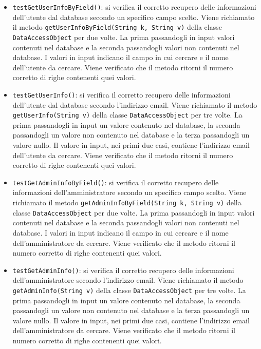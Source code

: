 {{\begin{itemize}
\begin{itemize}
\begin{itemize}
						\item \texttt{testGetUserInfoByField()}: si verifica il corretto recupero delle informazioni dell'utente dal database secondo un specifico campo scelto. Viene richiamato il metodo \texttt{getUserInfoByField(String k, String v)} della classe \texttt{DataAccessObject} per due volte. La prima passandogli in input valori contenuti nel database e la seconda passandogli valori non contenuti nel database. I valori in input indicano il campo in cui cercare e il nome dell'utente da cercare. Viene verificato che il metodo ritorni il numero corretto di righe contenenti quei valori.
						
						\item \texttt{testGetUserInfo()}: si verifica il corretto recupero delle informazioni dell'utente dal database secondo l'indirizzo email. Viene richiamato il metodo \texttt{getUserInfo(String v)} della classe \texttt{DataAccessObject} per tre volte. La prima passandogli in input un valore contenuto nel database, la seconda passandogli un valore non contenuto nel database e la terza passandogli un valore nullo. Il valore in input, nei primi due casi, contiene l'indirizzo email dell'utente da cercare. Viene verificato che il metodo ritorni il numero corretto di righe contenenti quei valori.
						
						\item \texttt{testGetAdminInfoByField()}: si verifica il corretto recupero delle informazioni dell'amministratore secondo un specifico campo scelto. \newline Viene richiamato il metodo \texttt{getAdminInfoByField(String k, String v)} della classe \texttt{DataAccessObject} per due volte. La prima passandogli in input valori contenuti nel database e la seconda passandogli valori non contenuti nel database. I valori in input indicano il campo in cui cercare e il nome dell'amministratore da cercare. Viene verificato che il metodo ritorni il numero corretto di righe contenenti quei valori.
						
						\item \texttt{testGetAdminInfo()}: si verifica il corretto recupero delle informazioni dell'amministratore secondo l'indirizzo email. Viene richiamato il metodo \texttt{getAdminInfo(String v)} della classe \texttt{DataAccessObject} per tre volte. La prima passandogli in input un valore contenuto nel database, la seconda passandogli un valore non contenuto nel database e la terza passandogli un valore nullo. Il valore in input, nei primi due casi, contiene l'indirizzo email dell'amministratore da cercare. Viene verificato che il metodo ritorni il numero corretto di righe contenenti quei valori.
						

\end{itemize}
\end{itemize}
\end{itemize}}}
